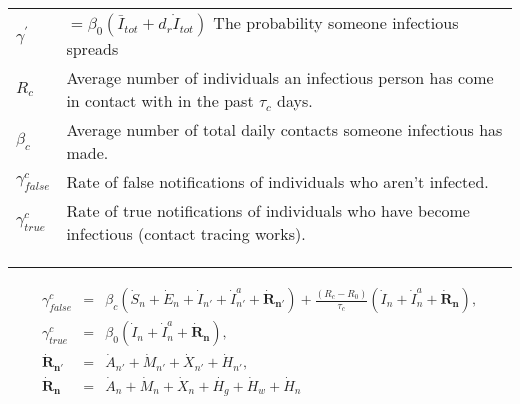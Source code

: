 \documentclass[notitlepage, superscriptaddress]{revtex4-2}
\begin{document}
\begin{table}[]
\begin{tabular}{ll}
$\gamma^{'}$                & $=\beta_{0} (\bar{I}_{tot} + d_{r} \dot{I}_{tot})$  The probability someone infectious spreads      \\
$R_{c}$             & Average number of individuals an infectious person has come in contact with in the past $\tau_{c}$ days. \\
$\beta_{c}$                 & Average number of total daily contacts someone infectious has made.                                \\
$\gamma^{c}_{false}$        & Rate of false notifications of individuals who aren't infected.                                    \\
$\gamma^{c}_{true}$ & Rate of true notifications of individuals who have become infectious (contact tracing works).            \\
                            &                                                                                                    \\
                            &                                                                                                    \\
                            &                                                                                                   
\end{tabular}
\end{table}

\begin{eqnarray}
\gamma^{c}_{false} &=& \beta_{c} (\dot{S}_{n} + \dot{E}_{n} + \dot{I}_{n'} + \dot{I}^{a}_{n'} + \boldsymbol{\dot{R}_{n'}}) + \frac{(R_{c}-R_{0})}{\tau_{c}}(\dot{I}_{n} + \dot{I}^{a}_{n} + \boldsymbol{\dot{R}_{n}}), \\
%
\gamma^{c}_{true} &=& \beta_{0} (\dot{I}_{n} + \dot{I}^{a}_{n} + \boldsymbol{\dot{R}_{n}}), \\ 
%
\boldsymbol{\dot{R}_{n'}} &=& \dot{A}_{n'} + \dot{M}_{n'} + \dot{X}_{n'} + \dot{H}_{n'}, \\
%
\boldsymbol{\dot{R}_{n}} &=& \dot{A}_{n} + \dot{M}_{n} + \dot{X}_{n} + \dot{H_{g}} + \dot{H}_{w} + \dot{H}_{n}
\end{eqnarray}
\end{document}
